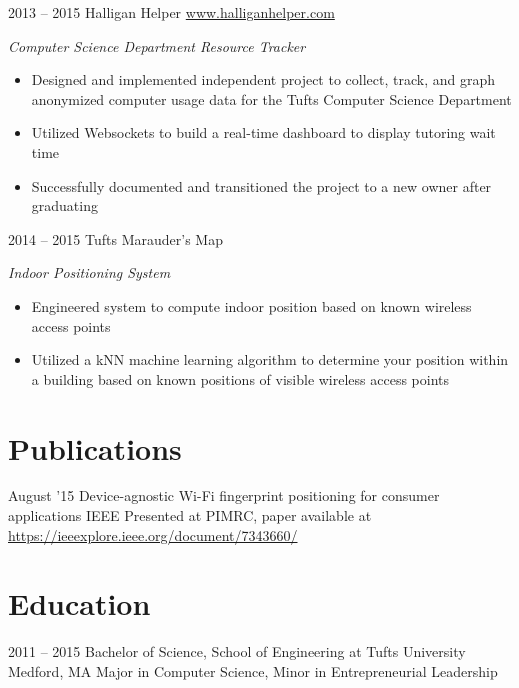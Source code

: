 \documentclass[print]{friggeri-cv} %
\begin{document}
\begin{entrylist}
\entry
{2013 -- 2015}
{Halligan Helper}
{\href{https://www.halliganhelper.com}{www.halliganhelper.com}}
{\emph{Computer Science Department Resource Tracker}
\begin{itemize}
\item Designed and implemented independent project to collect, track, and graph anonymized computer usage data for the Tufts Computer Science Department
\item Utilized Websockets to build a real-time dashboard to display tutoring wait time
\item Successfully documented and transitioned the project to a new owner after graduating
\end{itemize}}
\entry
{2014 -- 2015}
{Tufts Marauder's Map}
{}
{\emph{Indoor Positioning System}
\begin{itemize}
\item Engineered system to compute indoor position based on known wireless access points
\item Utilized a kNN machine learning algorithm to determine your position within a building based on known positions of visible wireless access points
\end{itemize}}
\end{entrylist}

\section{Publications}
\begin{entrylist}
\entry
{August '15}
{Device-agnostic Wi-Fi fingerprint positioning for consumer applications}
{IEEE}
{Presented at PIMRC, paper available at \href{https://ieeexplore.ieee.org/document/7343660/}{https://ieeexplore.ieee.org/document/7343660/}}
\end{entrylist}



\section{Education}
\begin{entrylist}
\entry
{2011 -- 2015}
{Bachelor of Science, School of Engineering at Tufts University}
{Medford, MA}
{Major in Computer Science, Minor in Entrepreneurial Leadership}


\end{entrylist}
\end{document}
